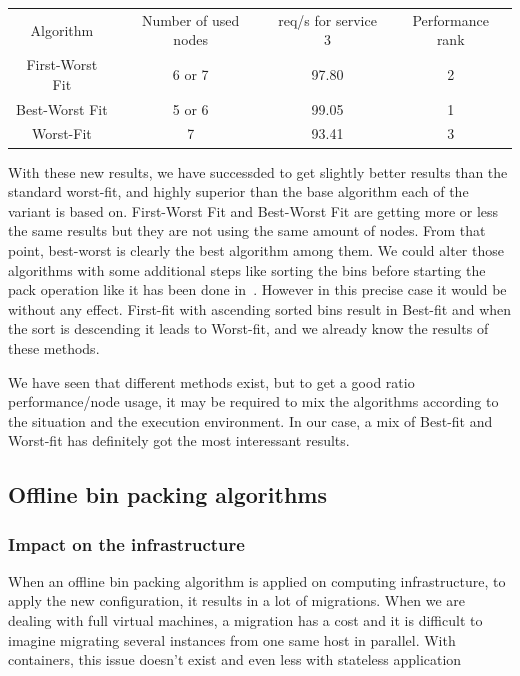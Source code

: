 \vspace{1em}
\begin{tabular}{c | c | c | c}
	Algorithm & Number of used nodes & req/s for service 3 & Performance rank \\
	First-Worst Fit & 6 or 7 & 97.80 & 2 \\
	Best-Worst Fit & 5 or 6 & 99.05 & 1 \\
	Worst-Fit & 7 & 93.41 & 3 \\
\end{tabular}
\vspace{1em}

With these new results, we have successded to get slightly better results than
the standard worst-fit, and highly superior than the base algorithm each of the
variant is based on. First-Worst Fit and Best-Worst Fit are getting more or
less the same results but they are not using the same amount of nodes. From
that point, best-worst is clearly the best algorithm among them.  We could
alter those algorithms with some additional steps like sorting the bins before
starting the pack operation like it has been done
in~\cite{allocationHeterogeneous}.  However in this precise case it would be
without any effect. First-fit with ascending sorted bins result in Best-fit and
when the sort is descending it leads to Worst-fit, and we already know the
results of these methods.

We have seen that different methods exist, but to get a good ratio
performance/node usage, it may be required to mix the algorithms according to
the situation and the execution environment.  In our case, a mix of Best-fit
and Worst-fit has definitely got the most interessant results.

\subsection{Offline bin packing algorithms}

\subsubsection{Impact on the infrastructure}

When an offline bin packing algorithm is applied on computing infrastructure,
to apply the new configuration, it results in a lot of migrations. When we are
dealing with full virtual machines, a migration has a cost and it is difficult
to imagine migrating several instances from one same host in parallel. With
containers, this issue doesn't exist and even less with stateless application

